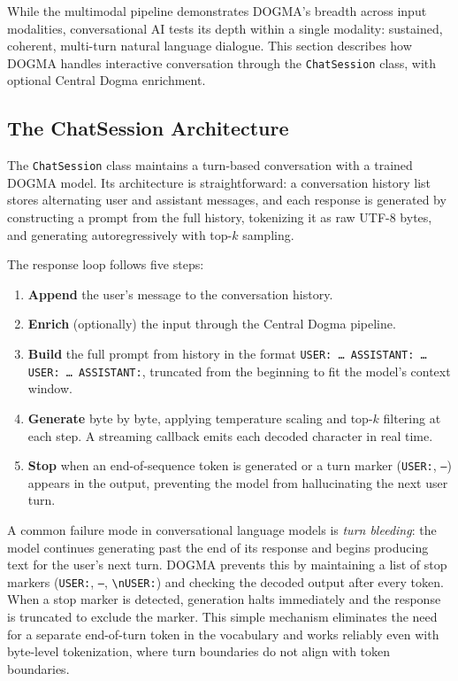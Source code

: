 While the multimodal pipeline demonstrates DOGMA's breadth across input modalities, conversational AI tests its depth within a single modality: sustained, coherent, multi-turn natural language dialogue. This section describes how DOGMA handles interactive conversation through the \texttt{ChatSession} class, with optional Central Dogma enrichment.

\subsection{The ChatSession Architecture}
\label{sec:chat-session}

The \texttt{ChatSession} class maintains a turn-based conversation with a trained DOGMA model. Its architecture is straightforward: a conversation history list stores alternating user and assistant messages, and each response is generated by constructing a prompt from the full history, tokenizing it as raw UTF-8 bytes, and generating autoregressively with top-$k$ sampling.

The response loop follows five steps:
\begin{enumerate}[leftmargin=1.8em]
  \item \textbf{Append} the user's message to the conversation history.
  \item \textbf{Enrich} (optionally) the input through the Central Dogma pipeline.
  \item \textbf{Build} the full prompt from history in the format \texttt{USER: \ldots{} ASSISTANT: \ldots{} USER: \ldots{} ASSISTANT:}, truncated from the beginning to fit the model's context window.
  \item \textbf{Generate} byte by byte, applying temperature scaling and top-$k$ filtering at each step. A streaming callback emits each decoded character in real time.
  \item \textbf{Stop} when an end-of-sequence token is generated or a turn marker (\texttt{USER:}, \texttt{---}) appears in the output, preventing the model from hallucinating the next user turn.
\end{enumerate}

\begin{implnote}
A common failure mode in conversational language models is \emph{turn bleeding}: the model continues generating past the end of its response and begins producing text for the user's next turn. DOGMA prevents this by maintaining a list of stop markers (\texttt{USER:}, \texttt{---}, \texttt{\textbackslash nUSER:}) and checking the decoded output after every token. When a stop marker is detected, generation halts immediately and the response is truncated to exclude the marker. This simple mechanism eliminates the need for a separate end-of-turn token in the vocabulary and works reliably even with byte-level tokenization, where turn boundaries do not align with token boundaries.
\end{implnote}

